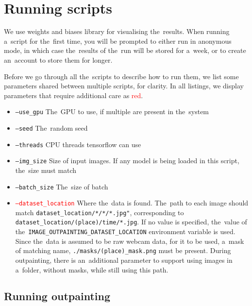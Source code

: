 \section{Running scripts}

We use weights and biases library \citep{wandb} for visualising the~results. When running a~script for the~first time, you will be prompted to either run in anonymous mode, in which case the~results of the~run will be stored for a~week, or to create an~account to store them for longer. 

Before we go through all the~scripts to describe how to run them, we list some parameters shared between multiple scripts, for clarity. In all listings, we display parameters that require additional care as \textcolor{red}{red}.
\begin{itemize}
    \item \texttt{--use\_gpu} The~GPU to use, if multiple are present in the~system
    \item \texttt{--seed} The~random seed
    \item \texttt{--threads} CPU threads tensorflow can use
    \item \texttt{--img\_size} Size of input images. If any model is being loaded in this script, the~size must match
    \item \texttt{--batch\_size} The~size of batch
    \item \textcolor{red}{\texttt{--dataset\_location}} Where the~data is found. The~path to each image should match \texttt{dataset\_location/*/*/*.jpg"}, corresponding to \texttt{dataset\_location/(place)/time/*.jpg}. If no value is specified, the~value of the~\texttt{IMAGE\_OUTPAINTING\_DATASET\_LOCATION} environment variable is used. Since the~data is assumed to be raw webcam data, for it to be used, a~mask of matching name, \texttt{./masks/(place)\_mask.png} must be present. During outpainting, there is an~additional parameter to support using images in a~folder, without masks, while still using this path.
\end{itemize}



\subsection{Running outpainting}




